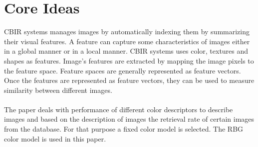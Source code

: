 \documentclass[pstricks,10pt]{report}
\begin{document}
\section{Core Ideas}
CBIR systems manages images by automatically indexing them by summarizing their visual features. A feature can capture some characteristics of images either in a global manner or in a local manner. CBIR systems uses color, textures and shapes as features. Image’s features are extracted by mapping the image pixels to the feature space. Feature spaces are generally represented as feature vectors. Once the features are represented as feature vectors, they can be used to measure similarity between different images.\\
\\
The paper deals with performance of different color descriptors to describe images and based on the description of images the retrieval rate of certain images from the database. For that purpose a fixed color model is selected. The RBG color model is used in this paper. 
\end{document}
